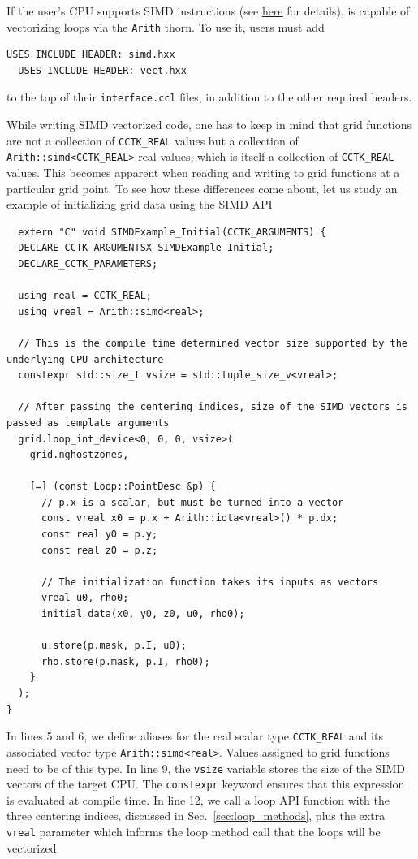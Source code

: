 If the user's CPU supports SIMD instructions (see \href{https://en.wikipedia.org/wiki/Single_instruction,_multiple_data}{here} for details), \CarpetX\space is capable of vectorizing loops via the \texttt{Arith} thorn. To use it, users must add
%
\begin{lstlisting}[language=bash]
  USES INCLUDE HEADER: simd.hxx
  USES INCLUDE HEADER: vect.hxx
\end{lstlisting}
%
to the top of their \texttt{interface.ccl} files, in addition to the other required headers.

While writing SIMD vectorized code, one has to keep in mind that grid functions are not a collection of \texttt{CCTK\_REAL} values but a collection of \texttt{Arith::simd<CCTK\_REAL>} real values, which is itself a collection of \texttt{CCTK\_REAL} values. This becomes apparent when reading and writing to grid functions at a particular grid point. To see how these differences come about, let us study an example of initializing grid data using the SIMD API
%
\begin{lstlisting}
  extern "C" void SIMDExample_Initial(CCTK_ARGUMENTS) {
  DECLARE_CCTK_ARGUMENTSX_SIMDExample_Initial;
  DECLARE_CCTK_PARAMETERS;

  using real = CCTK_REAL;
  using vreal = Arith::simd<real>;
  
  // This is the compile time determined vector size supported by the underlying CPU architecture
  constexpr std::size_t vsize = std::tuple_size_v<vreal>;

  // After passing the centering indices, size of the SIMD vectors is passed as template arguments
  grid.loop_int_device<0, 0, 0, vsize>(
    grid.nghostzones,
    
    [=] (const Loop::PointDesc &p) {
      // p.x is a scalar, but must be turned into a vector
      const vreal x0 = p.x + Arith::iota<vreal>() * p.dx;
      const real y0 = p.y;
      const real z0 = p.z;
      
      // The initialization function takes its inputs as vectors
      vreal u0, rho0;
      initial_data(x0, y0, z0, u0, rho0);
      
      u.store(p.mask, p.I, u0);
      rho.store(p.mask, p.I, rho0);
    }
  );
}
\end{lstlisting}

In lines 5 and 6, we define aliases for the real scalar type \texttt{CCTK\_REAL} and its associated vector type \texttt{Arith::simd<real>}. Values assigned to grid functions need to be of this type. In line 9, the \texttt{vsize} variable stores the size of the SIMD vectors of the target CPU. The \texttt{constexpr} keyword ensures that this expression is evaluated at compile time. In line 12, we call a loop API function with the three centering indices, discussed in Sec.~\ref{sec:loop_methods}, plus the extra \texttt{vreal} parameter which informs the loop method call that the loops will be vectorized.

